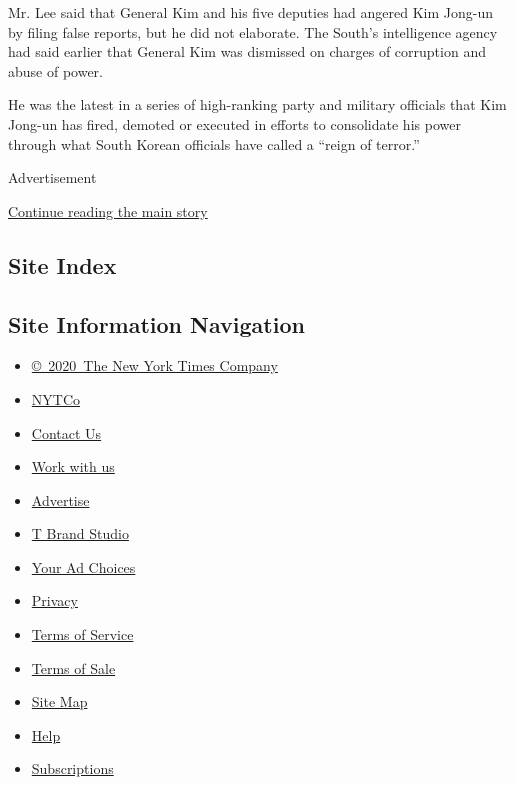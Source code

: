 Mr. Lee said that General Kim and his five deputies had angered Kim
Jong-un by filing false reports, but he did not elaborate. The South's
intelligence agency had said earlier that General Kim was dismissed on
charges of corruption and abuse of power.

He was the latest in a series of high-ranking party and military
officials that Kim Jong-un has fired, demoted or executed in efforts to
consolidate his power through what South Korean officials have called a
``reign of terror.''

Advertisement

\protect\hyperlink{after-bottom}{Continue reading the main story}

\hypertarget{site-index}{%
\subsection{Site Index}\label{site-index}}

\hypertarget{site-information-navigation}{%
\subsection{Site Information
Navigation}\label{site-information-navigation}}

\begin{itemize}
\tightlist
\item
  \href{https://help.nytimes.com/hc/en-us/articles/115014792127-Copyright-notice}{©~2020~The
  New York Times Company}
\end{itemize}

\begin{itemize}
\tightlist
\item
  \href{https://www.nytco.com/}{NYTCo}
\item
  \href{https://help.nytimes.com/hc/en-us/articles/115015385887-Contact-Us}{Contact
  Us}
\item
  \href{https://www.nytco.com/careers/}{Work with us}
\item
  \href{https://nytmediakit.com/}{Advertise}
\item
  \href{http://www.tbrandstudio.com/}{T Brand Studio}
\item
  \href{https://www.nytimes.com/privacy/cookie-policy\#how-do-i-manage-trackers}{Your
  Ad Choices}
\item
  \href{https://www.nytimes.com/privacy}{Privacy}
\item
  \href{https://help.nytimes.com/hc/en-us/articles/115014893428-Terms-of-service}{Terms
  of Service}
\item
  \href{https://help.nytimes.com/hc/en-us/articles/115014893968-Terms-of-sale}{Terms
  of Sale}
\item
  \href{https://spiderbites.nytimes.com}{Site Map}
\item
  \href{https://help.nytimes.com/hc/en-us}{Help}
\item
  \href{https://www.nytimes.com/subscription?campaignId=37WXW}{Subscriptions}
\end{itemize}
